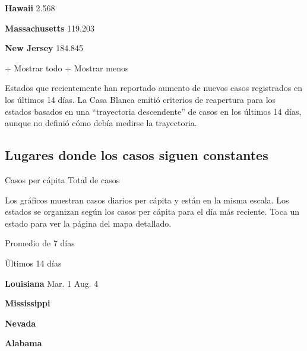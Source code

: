 \href{https://www.nytimes3xbfgragh.onion/interactive/2020/us/hawaii-coronavirus-cases.html}{}

\textbf{Hawaii} 2.568

\href{https://www.nytimes3xbfgragh.onion/interactive/2020/us/massachusetts-coronavirus-cases.html}{}

\textbf{Massachusetts} 119.203

\href{https://www.nytimes3xbfgragh.onion/interactive/2020/us/new-jersey-coronavirus-cases.html}{}

\textbf{New Jersey} 184.845

+ Mostrar todo + Mostrar menos

Estados que recientemente han reportado aumento de nuevos casos
registrados en los últimos 14 días. La Casa Blanca emitió criterios de
reapertura para los estados basados en una ``trayectoria descendente''
de casos en los últimos 14 días, aunque no definió cómo debía medirse la
trayectoria.

\hypertarget{lugares-donde-los-casos-siguen-constantes}{%
\subsection{Lugares donde los casos siguen
constantes}\label{lugares-donde-los-casos-siguen-constantes}}

Casos per cápita Total de casos

Los gráficos muestran casos diarios per cápita y están en la misma
escala. Los estados se organizan según los casos per cápita para el día
más reciente. Toca un estado para ver la página del mapa detallado.

\href{https://www.nytimes3xbfgragh.onion/interactive/2020/us/louisiana-coronavirus-cases.html}{}

Promedio de 7 días

Últimos 14 días

\textbf{Louisiana} Mar. 1 Aug. 4

\href{https://www.nytimes3xbfgragh.onion/interactive/2020/us/mississippi-coronavirus-cases.html}{}

\textbf{Mississippi}

\href{https://www.nytimes3xbfgragh.onion/interactive/2020/us/nevada-coronavirus-cases.html}{}

\textbf{Nevada}

\href{https://www.nytimes3xbfgragh.onion/interactive/2020/us/alabama-coronavirus-cases.html}{}

\textbf{Alabama}


